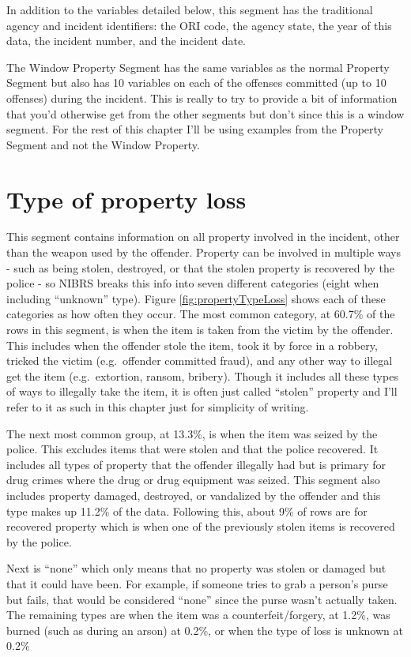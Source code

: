 \documentclass[
]{krantz}
\begin{document}
In addition to the variables detailed below, this segment
has the traditional agency and incident identifiers: the ORI
code, the agency state, the year of this data, the incident
number, and the incident date.

The Window Property Segment has the same variables as the
normal Property Segment but also has 10 variables on each of
the offenses committed (up to 10 offenses) during the
incident. This is really to try to provide a bit of
information that you'd otherwise get from the other segments
but don't since this is a window segment. For the rest of
this chapter I'll be using examples from the Property
Segment and not the Window Property.

\section{Type of property loss}\label{propertyLoss}

This segment contains information on all property involved
in the incident, other than the weapon used by the offender.
Property can be involved in multiple ways - such as being
stolen, destroyed, or that the stolen property is recovered
by the police - so NIBRS breaks this info into seven
different categories (eight when including ``unknown''
type). Figure \ref{fig:propertyTypeLoss} shows each of these
categories as how often they occur. The most common
category, at 60.7\% of the rows in this segment, is when the
item is taken from the victim by the offender. This includes
when the offender stole the item, took it by force in a
robbery, tricked the victim (e.g.~offender committed fraud),
and any other way to illegal get the item (e.g.~extortion,
ransom, bribery). Though it includes all these types of ways
to illegally take the item, it is often just called
``stolen'' property and I'll refer to it as such in this
chapter just for simplicity of writing.

The next most common group, at 13.3\%, is when the item was
seized by the police. This excludes items that were stolen
and that the police recovered. It includes all types of
property that the offender illegally had but is primary for
drug crimes where the drug or drug equipment was seized.
This segment also includes property damaged, destroyed, or
vandalized by the offender and this type makes up 11.2\% of
the data. Following this, about 9\% of rows are for
recovered property which is when one of the previously
stolen items is recovered by the police.

Next is ``none'' which only means that no property was
stolen or damaged but that it could have been. For example,
if someone tries to grab a person's purse but fails, that
would be considered ``none'' since the purse wasn't actually
taken. The remaining types are when the item was a
counterfeit/forgery, at 1.2\%, was burned (such as during an
arson) at 0.2\%, or when the type of loss is unknown at
0.2\%
\end{document}
